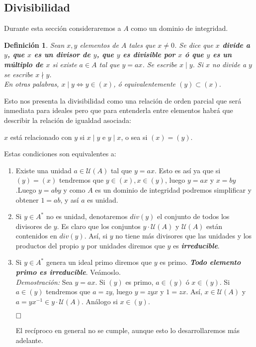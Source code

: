 \documentclass[12pt]{article}
\newtheorem{definition}[theorem]{Definición}
\begin{document}
\subsection{Divisibilidad}

Durante esta sección consideraremos a $A$ como un dominio de integridad.

\begin{definition} Sean $x, y$ elementos de $A$ tales que $x \neq 0$. Se dice que \textbf{$x$ divide a $y$, que $x$ es un divisor de $y$, que $y$ es divisible por $x$ ó que $y$ es un múltiplo de $x$} si existe $a \in A$ tal que $y = ax$. Se escribe $x \mid y$. Si $x$ no divide a $y$ se escribe $x \nmid y$.\vspace{0.2cm}\\
En otras palabras, $x \mid y \Leftrightarrow y \in (x)$, ó equivalentemente $(y) \subset (x)$.
\end{definition}

Esto nos presenta la divisibilidad como una relación de orden parcial que será inmediata para ideales pero que para entenderla entre elementos habrá que describir la relación de igualdad asociada: 
\begin{center}
$x$ está relacionado con $y$ si $x \mid y$ e $y \mid x$, o sea si $(x) = (y).$
\end{center} 
Estas condiciones son equivalentes a: \begin{enumerate}
\item Existe una unidad $a \in \mathcal{U}(A)$ tal que $y = ax$. Esto es así ya que si $(y) = (x)$ tendremos que $y \in (x), x \in (y)$, luego $y = ax$ y $x = by$.Luego $y = aby$ y como $A$ es un dominio de integridad podremos simplificar y obtener $1 = ab$, y así $a$ es unidad.
\item Si $y \in A^{\ast}$ no es unidad, denotaremos $div(y)$ el conjunto de todos los divisores de $y$. Es claro que los conjuntos $y \cdot \mathcal{U}(A)$ y $\mathcal{U}(A)$ están contenidos en $div(y)$. Así, si $y$ no tiene más divisores que las unidades y los productos del propio $y$ por unidades diremos que $y$ es \textbf{\textit{irreducible}}.
\item Si $y \in A^{\ast}$ genera un ideal primo diremos que $y$ es primo. \textbf{\textit{Todo elemento primo es irreducible}}. Veámoslo. \vspace{0.2cm}\\
\emph{Demostración: } Sea $y = ax$. Si $(y)$ es primo, $a \in (y)$ ó $x \in (y)$. Si $a \in (y)$ tendremos que $a = zy$, luego $y = zyx$ y $1 = zx$. Así, $x \in \mathcal{U}(A)$ y $a = yx^{-1} \in y \cdot \mathcal{U}(A)$. Análogo si $x \in (y)$.

$\hfill \square$

El recíproco en general no se cumple, aunque esto lo desarrollaremos más adelante.
\end{enumerate} 
\end{document}
